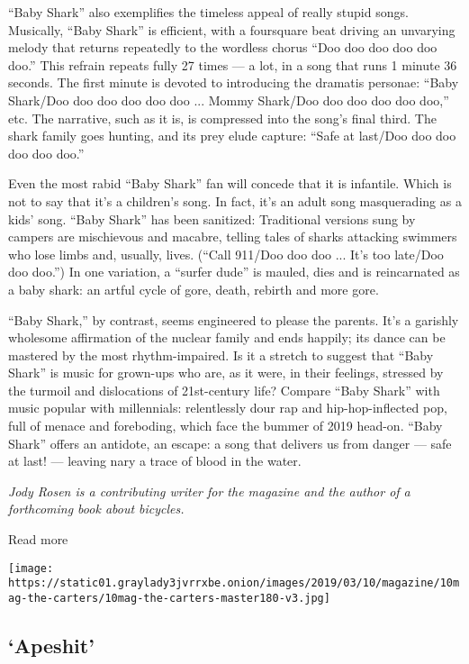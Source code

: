 ``Baby Shark'' also exemplifies the timeless appeal of really stupid
songs. Musically, ``Baby Shark'' is efficient, with a foursquare beat
driving an unvarying melody that returns repeatedly to the wordless
chorus ``Doo doo doo doo doo doo.'' This refrain repeats fully 27 times
--- a lot, in a song that runs 1 minute 36 seconds. The first minute is
devoted to introducing the dramatis personae: ``Baby Shark/Doo doo doo
doo doo doo ... Mommy Shark/Doo doo doo doo doo doo,'' etc. The
narrative, such as it is, is compressed into the song's final third. The
shark family goes hunting, and its prey elude capture: ``Safe at
last/Doo doo doo doo doo doo.''

Even the most rabid ``Baby Shark'' fan will concede that it is
infantile. Which is not to say that it's a children's song. In fact,
it's an adult song masquerading as a kids' song. ``Baby Shark'' has been
sanitized: Traditional versions sung by campers are mischievous and
macabre, telling tales of sharks attacking swimmers who lose limbs and,
usually, lives. (``Call 911/Doo doo doo ... It's too late/Doo doo
doo.'') In one variation, a ``surfer dude'' is mauled, dies and is
reincarnated as a baby shark: an artful cycle of gore, death, rebirth
and more gore.

``Baby Shark,'' by contrast, seems engineered to please the parents.
It's a garishly wholesome affirmation of the nuclear family and ends
happily; its dance can be mastered by the most rhythm-impaired. Is it a
stretch to suggest that ``Baby Shark'' is music for grown-ups who are,
as it were, in their feelings, stressed by the turmoil and dislocations
of 21st-century life? Compare ``Baby Shark'' with music popular with
millennials: relentlessly dour rap and hip-hop-inflected pop, full of
menace and foreboding, which face the bummer of 2019 head-on. ``Baby
Shark'' offers an antidote, an escape: a song that delivers us from
danger --- safe at last! --- leaving nary a trace of blood in the water.

\emph{Jody Rosen is a contributing writer for the magazine and the
author of a forthcoming book about bicycles.}

Read more

\texttt{[image: https://static01.graylady3jvrrxbe.onion/images/2019/03/10/magazine/10mag-the-carters/10mag-the-carters-master180-v3.jpg]}

\hypertarget{--apeshit}{%
\subsection{\texorpdfstring{ `Apeshit'}{  `Apeshit'}}\label{--apeshit}}

